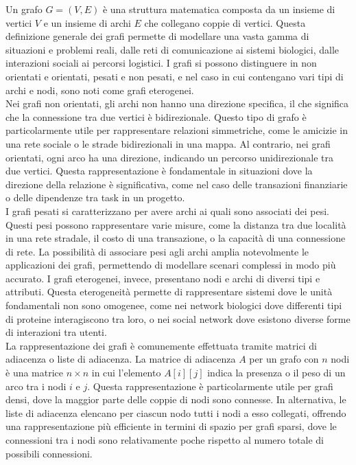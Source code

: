 \documentclass{article}
\begin{document}
Un grafo \(G = (V, E)\) è una struttura matematica composta da un insieme di vertici \(V\) e un insieme di archi \(E\) che collegano coppie di vertici. Questa definizione generale dei grafi permette di modellare una vasta gamma di situazioni e problemi reali, dalle reti di comunicazione ai sistemi biologici, dalle interazioni sociali ai percorsi logistici. I grafi si possono distinguere in non orientati e orientati, pesati e non pesati, e nel caso in cui contengano vari tipi di archi e nodi, sono noti come grafi eterogenei.\\
Nei grafi non orientati, gli archi non hanno una direzione specifica, il che significa che la connessione tra due vertici è bidirezionale. Questo tipo di grafo è particolarmente utile per rappresentare relazioni simmetriche, come le amicizie in una rete sociale o le strade bidirezionali in una mappa. Al contrario, nei grafi orientati, ogni arco ha una direzione, indicando un percorso unidirezionale tra due vertici. Questa rappresentazione è fondamentale in situazioni dove la direzione della relazione è significativa, come nel caso delle transazioni finanziarie o delle dipendenze tra task in un progetto.\\
I grafi pesati si caratterizzano per avere archi ai quali sono associati dei pesi. Questi pesi possono rappresentare varie misure, come la distanza tra due località in una rete stradale, il costo di una transazione, o la capacità di una connessione di rete. La possibilità di associare pesi agli archi amplia notevolmente le applicazioni dei grafi, permettendo di modellare scenari complessi in modo più accurato. I grafi eterogenei, invece, presentano nodi e archi di diversi tipi e attributi. Questa eterogeneità permette di rappresentare sistemi dove le unità fondamentali non sono omogenee, come nei network biologici dove differenti tipi di proteine interagiscono tra loro, o nei social network dove esistono diverse forme di interazioni tra utenti.\\
La rappresentazione dei grafi è comunemente effettuata tramite matrici di adiacenza o liste di adiacenza. La matrice di adiacenza \(A\) per un grafo con \(n\) nodi è una matrice \(n \times n\) in cui l'elemento \(A[i][j]\) indica la presenza o il peso di un arco tra i nodi \(i\) e \(j\). Questa rappresentazione è particolarmente utile per grafi densi, dove la maggior parte delle coppie di nodi sono connesse. In alternativa, le liste di adiacenza elencano per ciascun nodo tutti i nodi a esso collegati, offrendo una rappresentazione più efficiente in termini di spazio per grafi sparsi, dove le connessioni tra i nodi sono relativamente poche rispetto al numero totale di possibili connessioni.\\
\end{document}
